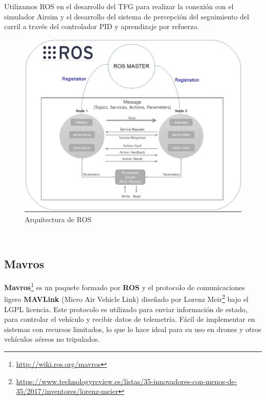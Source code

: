 Utilizamos ROS en el desarrollo del TFG para realizar la conexión con el simulador Airsim y el desarrollo del sistema de percepción del seguimiento del carril a través del controlador PID y 
aprendizaje por refuerzo. \newline


\begin{figure} [H]
    \begin{center}
      \includegraphics[scale=0.4]{figs/Plataformas_Desarollo/arq_ros.png}
    \end{center}
    \caption{Arquitectura de ROS}
    \label{fig:ArqROS}
  \end{figure}\
\newpage
\subsection{Mavros}
\label{sec:mavros}

\textbf{Mavros}\footnote{\url{http://wiki.ros.org/mavros}} es un paquete formado por \textbf{ROS} y el protocolo de comunicaciones ligero \textbf{MAVLink} (Micro Air Vehicle Link) diseñado por Lorenz Meir\footnote{\url{https://www.technologyreview.es/listas/35-innovadores-con-menos-de-35/2017/inventores/lorenz-meier}} bajo el LGPL licencia. Este protocolo es utilizado para enviar información de estado,
para controlar el vehículo y recibir datos de telemetría. Fácil de implementar en sistemas con recursos limitados, 
lo que lo hace ideal para su uso en drones y otros vehículos aéreos no tripulados. \newline

